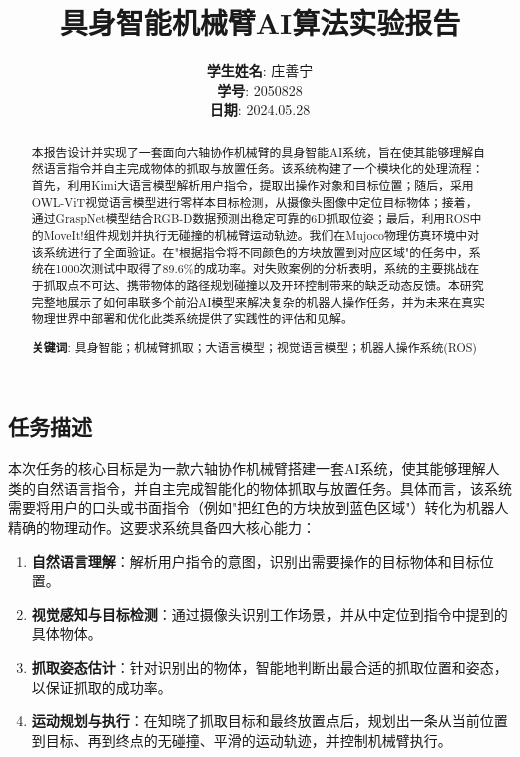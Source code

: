 \documentclass{article}
\title{具身智能机械臂AI算法实验报告}
\author{%
  \textbf{学生姓名}: 庄善宁 \\
  \textbf{学号}: 2050828 \\
  \textbf{日期}: 2024.05.28
}
\begin{document}
\begin{CJK*}{UTF8}{gbsn}

\maketitle


\begin{abstract}
本报告设计并实现了一套面向六轴协作机械臂的具身智能AI系统，旨在使其能够理解自然语言指令并自主完成物体的抓取与放置任务。该系统构建了一个模块化的处理流程：首先，利用Kimi大语言模型解析用户指令，提取出操作对象和目标位置；随后，采用OWL-ViT视觉语言模型进行零样本目标检测，从摄像头图像中定位目标物体；接着，通过GraspNet模型结合RGB-D数据预测出稳定可靠的6D抓取位姿；最后，利用ROS中的MoveIt!组件规划并执行无碰撞的机械臂运动轨迹。我们在Mujoco物理仿真环境中对该系统进行了全面验证。在"根据指令将不同颜色的方块放置到对应区域"的任务中，系统在1000次测试中取得了89.6\%的成功率。对失败案例的分析表明，系统的主要挑战在于抓取点不可达、携带物体的路径规划碰撞以及开环控制带来的缺乏动态反馈。本研究完整地展示了如何串联多个前沿AI模型来解决复杂的机器人操作任务，并为未来在真实物理世界中部署和优化此类系统提供了实践性的评估和见解。

\textbf{关键词}: 具身智能；机械臂抓取；大语言模型；视觉语言模型；机器人操作系统(ROS)
\end{abstract}

\section{任务描述}

本次任务的核心目标是为一款六轴协作机械臂搭建一套AI系统，使其能够理解人类的自然语言指令，并自主完成智能化的物体抓取与放置任务。具体而言，该系统需要将用户的口头或书面指令（例如"把红色的方块放到蓝色区域"）转化为机器人精确的物理动作。这要求系统具备四大核心能力：

\begin{enumerate}
    \item  \textbf{自然语言理解}：解析用户指令的意图，识别出需要操作的目标物体和目标位置。
    \item  \textbf{视觉感知与目标检测}：通过摄像头识别工作场景，并从中定位到指令中提到的具体物体。
    \item  \textbf{抓取姿态估计}：针对识别出的物体，智能地判断出最合适的抓取位置和姿态，以保证抓取的成功率。
    \item  \textbf{运动规划与执行}：在知晓了抓取目标和最终放置点后，规划出一条从当前位置到目标、再到终点的无碰撞、平滑的运动轨迹，并控制机械臂执行。
\end{enumerate}


\end{CJK*}
\end{document}
